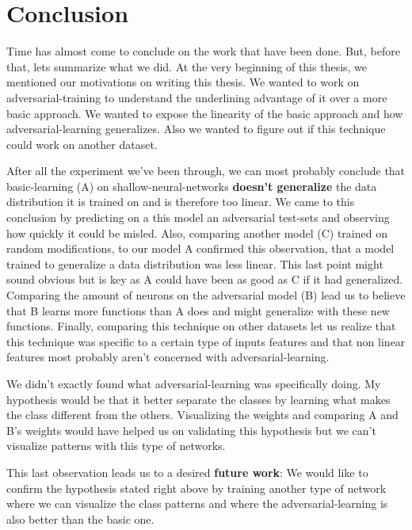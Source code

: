 \chapter{Conclusion}
\label{sec:conclusion}
	Time has almost come to conclude on the work that have been done. But, before that, lets summarize what we did. At the very beginning of this thesis, we mentioned our motivations on writing this thesis. We wanted to work on adversarial-training to understand the underlining advantage of it over a more basic approach. We wanted to expose the linearity of the basic approach and how adversarial-learning generalizes. Also we wanted to figure out if this technique could work on another dataset.

	After all the experiment we've been through, we can most probably conclude that basic-learning (A) on shallow-neural-networks \textbf{doesn't generalize} the data distribution it is trained on and is therefore too linear. We came to this conclusion by predicting on a this model an adversarial test-sets and observing how quickly it could be misled. Also, comparing another model (C) trained on random modifications, to our model A confirmed this observation, that a model trained to generalize a data distribution was less linear. This last point might sound obvious but is key as A could have been as good as C if it had generalized. Comparing the amount of neurons on the adversarial model (B) lead us to believe that B learns more functions than A does and might generalize with these new functions. Finally, comparing this technique on other datasets let us realize that this technique was specific to a certain type of inputs features and that non linear features most probably aren't concerned with adversarial-learning.

	We didn't exactly found what adversarial-learning was specifically doing. My hypothesis would be that it better separate the classes by learning what makes the class different from the others. Visualizing the weights and comparing A and B's weights would have helped us on validating this hypothesis but we can't visualize patterns with this type of networks.

	\vskip 1cm
	This last observation leads us to a desired \textbf{future work}: We would like to confirm the hypothesis stated right above by training another type of network where we can visualize the class patterns and where the adversarial-learning is also better than the basic one.